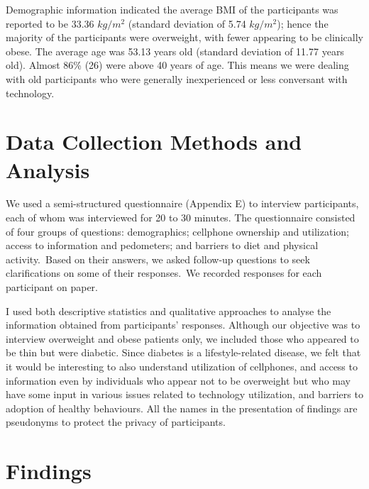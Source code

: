 Demographic information indicated the average BMI of the participants was reported to be 33.36 $kg/m^2$ (standard deviation of 5.74 $kg/m^2$); hence the majority of the participants were overweight, with fewer appearing to be clinically obese. The average age was 53.13 years old (standard deviation of 11.77 years old).  Almost 86\% (26) were above 40 years of age. This means we were dealing with old participants who were generally inexperienced or less conversant with technology.

\section{Data Collection Methods and Analysis}
We used a semi-structured questionnaire (Appendix E) to interview participants, each of whom was interviewed for 20 to 30 minutes. The questionnaire consisted of four groups of questions: demographics; cellphone ownership and utilization; access to information and pedometers; and barriers to diet and physical activity.~Based on their answers, we asked follow-up questions to seek clarifications on some of their responses.~We recorded responses for each participant on paper.

I used both descriptive statistics and qualitative approaches to analyse the information obtained from participants’ responses. Although our objective was to interview overweight and obese patients only, we included those who appeared to be thin but were diabetic. Since diabetes is a lifestyle-related disease, we felt that it would be interesting to also understand utilization of cellphones, and access to information even by individuals who appear not to be overweight but who may have some input in various issues related to technology utilization, and  barriers to adoption of healthy behaviours. All the names in the presentation of findings are pseudonyms to protect the privacy of participants. 
\section{Findings}
